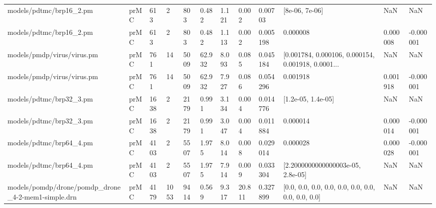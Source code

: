 \begin{tabular}{llllllllllll}
                           models/pdtmc/brp16\_2.pm & prMC &    613 &          2 &         803 &          0.482 &            1.121 &                        0.002 &        0.00703 &                                     [8e-06, 7e-06] &                NaN &          NaN \\
                           models/pdtmc/brp16\_2.pm & prMC &    613 &          2 &         803 &          0.482 &            1.113 &                        0.002 &       0.005198 &                                           0.000008 &           0.000008 &    -0.000001 \\
                        models/pmdp/virus/virus.pm & prMC &    761 &         14 &        5009 &         62.932 &            8.093 &                        0.085 &       0.045184 & [0.001784, 0.000106, 0.000154, 0.001918, 0.0001... &                NaN &          NaN \\
                        models/pmdp/virus/virus.pm & prMC &    761 &         14 &        5009 &         62.932 &            7.927 &                        0.086 &       0.054296 &                                           0.001918 &           0.001918 &    -0.000001 \\
                           models/pdtmc/brp32\_3.pm & prMC &   1638 &          2 &        2179 &          0.991 &            3.134 &                        0.004 &       0.014776 &                                 [1.2e-05, 1.4e-05] &                NaN &          NaN \\
                           models/pdtmc/brp32\_3.pm & prMC &   1638 &          2 &        2179 &          0.991 &            3.047 &                        0.004 &       0.011884 &                                           0.000014 &           0.000014 &    -0.000001 \\
                           models/pdtmc/brp64\_4.pm & prMC &   4103 &          2 &        5507 &          1.975 &            8.014 &                        0.008 &       0.029014 &                                           0.000028 &           0.000028 &    -0.000001 \\
                           models/pdtmc/brp64\_4.pm & prMC &   4103 &          2 &        5507 &          1.975 &            7.914 &                        0.009 &       0.033304 &                  [2.2000000000000003e-05, 2.8e-05] &                NaN &          NaN \\
models/pomdp/drone/pomdp\_drone\_4-2-mem1-simple.drn & prMC &   4179 &       1053 &        9414 &          0.569 &            9.317 &                       20.811 &       0.327899 & [0.0, 0.0, 0.0, 0.0, 0.0, 0.0, 0.0, 0.0, 0.0, 0.0] &                NaN &          NaN \\

\end{tabular}
